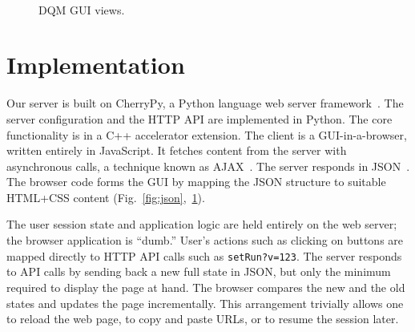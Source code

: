 \documentclass[a4paper]{jpconf}
\begin{document}
\begin{figure}[!tbp]
\begin{center}
\hfill
{}\hfill
{}\\
\hfill
{}\hfill
{}
\caption{\label{fig:views}DQM GUI views.}
\end{center}
\end{figure}


\section{Implementation}

Our server is built on CherryPy, a Python language web server
framework~\cite{cherrypy}.  The server configuration and the HTTP API
are implemented in Python.  The core functionality is in a C++
accelerator extension.  The client is a GUI-in-a-browser, written
entirely in JavaScript.  It fetches content from the server with
asynchronous calls, a technique known as
AJAX~\cite{dqm_ajax_06,cms_webtools_07}.  The server responds in
JSON~\cite{dqm_ajax_06,json}.  The browser code forms the GUI by
mapping the JSON structure to suitable HTML+CSS content
(Fig.~\ref{fig:json},~\ref{fig:views}).

The user session state and application logic are held entirely on the
web server; the browser application is ``dumb.'' User's actions such
as clicking on buttons are mapped directly to HTTP API calls such as
{\tt setRun?v=123}.  The server responds to API calls by sending back
a new full state in JSON, but only the minimum required to display the
page at hand.  The browser compares the new and the old states and
updates the page incrementally.  This arrangement trivially allows one
to reload the web page, to copy and paste URLs, or to resume the
session later.
\end{document}
